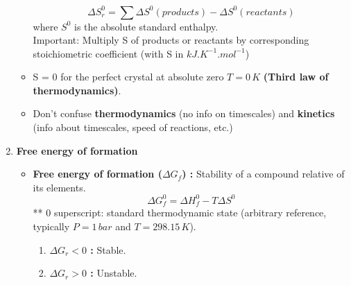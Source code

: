 \documentclass[a4paper,11pt]{article}
\begin{document}
\begin{enumerate}
\begin{itemize}
            \[\Delta S_r^0 = \sum \Delta S^0(products) - \Delta S^0(reactants)\] 
            where $S^0$ is the absolute standard enthalpy.\\
            Important: Multiply S of products or reactants by corresponding stoichiometric coefficient (with S in $kJ.K^{-1}.mol^{-1}$)
            \item S = 0 for the perfect crystal at absolute zero $T=0\,K$ \textbf{(Third law of thermodynamics)}.
            \item Don't confuse \textbf{thermodynamics} (no info on timescales) and \textbf{kinetics} (info about timescales, speed of reactions, etc.)
        \end{itemize}
    \item \textbf{Free energy of formation}
          
        \begin{itemize}
        \item \textbf{Free energy of formation
        ($\Delta G_f$) : } Stability of a compound relative of its elements.
            \[\Delta G^0_f = \Delta H^0_f - T \Delta S^0\]
            ** 0 superscript: standard thermodynamic state (arbitrary reference, typically $P=1\,bar$ and $T=298.15\,K$).
            \begin{enumerate}
                \item \textbf{$\Delta G_r < 0$ :} Stable.
                \item \textbf{$\Delta G_r > 0$ :} Unstable.
            \end{enumerate}
        \end{itemize}    
\end{enumerate}
\end{document}
